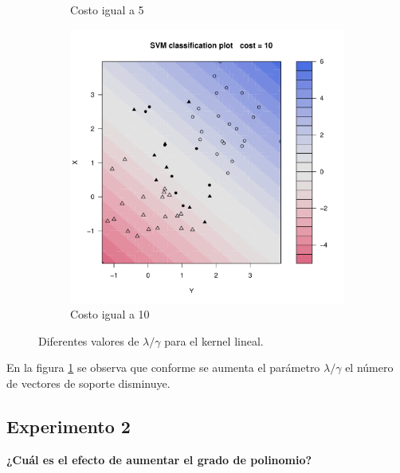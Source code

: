 \begin{figure}[H]
\begin{subfigure}{0.24\linewidth}
		\caption{Costo igual a 5}
	\end{subfigure}
	\begin{subfigure}{0.24\linewidth}
		\includegraphics[width=1\linewidth]{Graphics/Problema_01/Experiment_01_4.pdf}
		\caption{Costo igual a 10}
	\end{subfigure}
	\caption{Diferentes valores de $\lambda / \gamma$ para el kernel lineal.}
	\label{fig:experimento_1}
\end{figure}

En la figura \ref{fig:experimento_1} se observa que conforme se aumenta el parámetro $\lambda / \gamma$ el número de vectores de soporte disminuye.

\subsection*{Experimento 2}

\textbf{¿Cuál es el efecto de aumentar el grado de polinomio?}

